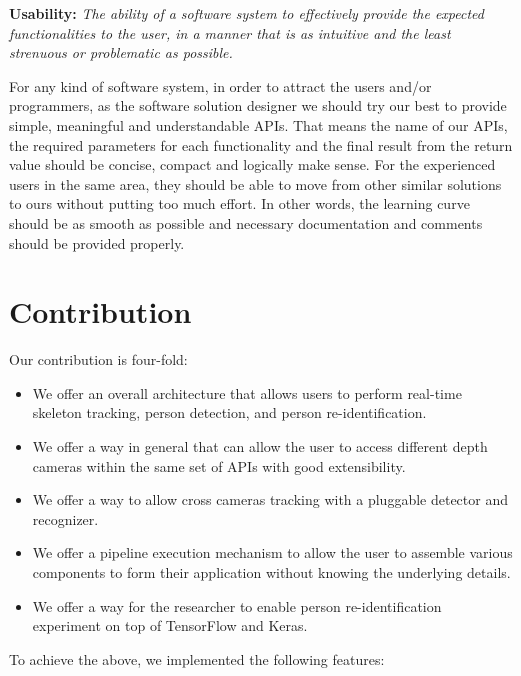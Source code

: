 \textbf{Usability:}
\textit{The ability of a software system to effectively provide the expected
functionalities to the user, in a manner that is as intuitive and the least
strenuous or problematic as possible.}

For any kind of software system, in order to attract the users and/or 
programmers, as the software solution designer we should try our best to 
provide simple, meaningful and understandable APIs.
That means the name of our APIs, the required parameters for each functionality
and the final result from the return value should be concise, compact and
logically make sense. For the experienced users in the same area, they should
be able to move from other similar solutions to ours without putting too much
effort.
In other words, the learning curve should be as smooth as possible
and necessary documentation and comments should be provided properly.

\section{Contribution}
\label{sec:intro-contrib}

Our contribution is four-fold:

\begin{itemize}
    \item We offer an overall architecture that allows users to perform
    real-time skeleton tracking, person detection, and person
    re-identification.
    
    \item We offer a way in general that can allow the user to access
    different depth cameras within the same set of APIs with good extensibility.
    
    \item We offer a way to allow cross cameras tracking with a pluggable
    detector and recognizer.
    
    \item We offer a pipeline execution mechanism to allow the user to assemble 
    various components to form their application without knowing the underlying 
    details.
    
    \item We offer a way for the researcher to enable person re-identification
    experiment on top of TensorFlow and Keras.
\end{itemize}

\noindent To achieve the above, we implemented the following features:

